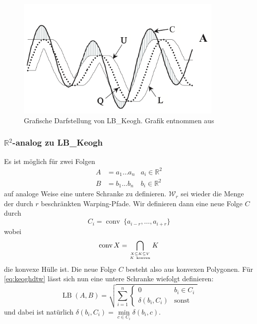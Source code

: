 \begin{figure}
  \centering \includegraphics[width=10cm]{figures/lb-keogh.png}
  \caption{Grafische Darfstellung von LB\_Keogh. Grafik entnommen aus \cite{Keogh:2005p7751}}
  \label{fig:lb_keogh}
\end{figure}

\subsubsection{\(\mathbb{R}^2\)-analog zu LB\_Keogh}\label{subs:lb_keogh_analog}

Es ist möglich für zwei Folgen 
\begin{align}
  A &= a_1 \dots a_n  & a_i \in \mathbb{R}^2 \\
  B &= b_1 \dots b_n  & b_i \in \mathbb{R}^2
\end{align}
auf analoge Weise eine untere Schranke zu definieren. \( \mathcal{W}_r \) sei wieder die Menge der durch \(r\) beschränkten Warping-Pfade. Wir definieren dann eine neue Folge $C$ durch
\begin{equation}
  C_i = \operatorname{conv} ~\{ a_{i-r}, \dots, a_{i+r} \}
\end{equation}
wobei
\[
  \operatorname{conv} X = \bigcap_{X\subseteq K \subseteq V \atop K\ \mathrm{konvex}} K
\]
die konvexe Hülle ist. Die neue Folge $C$ besteht also aus konvexen Polygonen. Für \ref{eq:keoghdtw} lässt sich nun eine untere Schranke wiefolgt definieren:
\begin{equation}
  \label{eq:lbkeoghanalog}
  \operatorname{LB}(A,B) = \sqrt{\sum_{i=1}^n
  \begin{cases}
    0 & b_i \in C_i \\
    \delta(b_i, C_i) & \text{sonst}
  \end{cases}  
  }
\end{equation}
und dabei ist natürlich \( \delta(b_i, C_i) = \min\limits_{c \in C_i} \delta(b_i, c) \).

